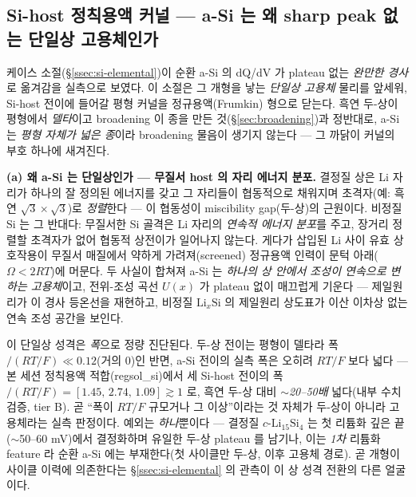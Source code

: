 \subsection{Si-host 정칙용액 커널 --- a-Si 는 왜 sharp peak 없는 단일상 고용체인가}\label{ssec:si-frumkin}
케이스 소절(\S\ref{ssec:si-elemental})이 순환 a-Si 의 dQ/dV 가 plateau 없는 \emph{완만한 경사}로 옮겨감을
실측으로 보였다. 이 소절은 그 개형을 낳는 \emph{단일상 고용체} 물리를 앞세워, Si-host 전이에 들어갈 평형 커널을
정규용액(Frumkin) 형으로 닫는다. 흑연 두-상이 평형에서 \emph{델타}이고 broadening 이 종을 만든 것(\S\ref{sec:broadening})과
정반대로, a-Si 는 \emph{평형 자체가 넓은 종}이라 broadening 물음이 생기지 않는다 --- 그 까닭이 커널의 부호 하나에
새겨진다.

\textbf{(a) 왜 a-Si 는 단일상인가 --- 무질서 host 의 자리 에너지 분포.} 결정질 상은 Li 자리가 하나의 잘 정의된
에너지를 갖고 그 자리들이 협동적으로 채워지며 초격자(예: 흑연 $\sqrt3\!\times\!\sqrt3$)로 \emph{정렬}한다 --- 이 협동성이
miscibility gap(두-상)의 근원이다. 비정질 Si 는 그 반대다: 무질서한 Si 골격은 Li 자리의 \emph{연속적 에너지 분포}를
주고, 장거리 정렬할 초격자가 없어 협동적 상전이가 일어나지 않는다. 게다가 삽입된 Li 사이 유효 상호작용이 무질서
매질에서 약하게 가려져(screened) 정규용액 인력이 문턱 아래($\Omega<2RT$)에 머문다. 두 사실이 합쳐져 a-Si 는
\emph{하나의 상 안에서 조성이 연속으로 변하는 고용체}이고, 전위-조성 곡선 $U(x)$ 가 plateau 없이 매끄럽게
기운다 --- 제일원리가 이 경사 등온선을 재현하고\cite{chevrier_dahn2009}, 비정질 $\mathrm{Li}_x\mathrm{Si}$ 의
제일원리 상도표가 이산 이차상 없는 연속 조성 공간을 보인다\cite{artrith2018}.

이 단일상 성격은 \emph{폭}으로 정량 진단된다. 두-상 전이는 평형이 델타라 폭$/(RT/F)\!\ll\!0.12$(거의 0)인 반면,
a-Si 전이의 실측 폭은 오히려 $RT/F$ 보다 넓다 --- 본 세션 정칙용액 적합(regsol\_si)에서 세 Si-host 전이의
폭$/(RT/F)=[1.45,\,2.74,\,1.09]\gtrsim1$ 로, 흑연 두-상 대비 \emph{$\sim$20--50배} 넓다(내부 수치 검증, tier B).
곧 ``폭이 $RT/F$ 규모거나 그 이상''이라는 것 자체가 두-상이 아니라 고용체라는 실측 판정이다. 예외는 \emph{하나}뿐이다
--- 결정질 $c$-$\mathrm{Li_{15}Si_4}$ 는 첫 리튬화 깊은 끝($\sim$50--60 mV)에서 결정화하며 유일한 두-상 plateau 를
남기나\cite{obrovac_christensen2004,limthongkul2003}, 이는 \emph{1차} 리튬화 feature 라 순환 a-Si 에는
부재한다(첫 사이클만 두-상, 이후 고용체 경로\cite{wang_asi2013,mcdowell_coreshell2013}). 곧 개형이 사이클 이력에
의존한다는 \S\ref{ssec:si-elemental} 의 관측이 이 상 성격 전환의 다른 얼굴이다.

